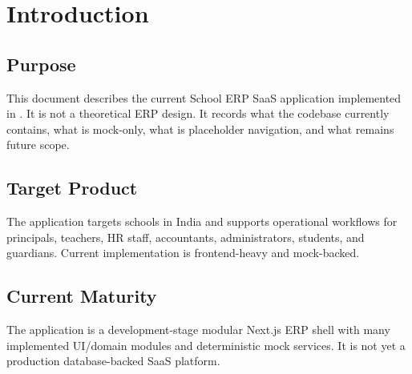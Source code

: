 \chapter{Introduction}
\section{Purpose}
This document describes the current School ERP SaaS application implemented in \RepositoryPath. It is not a theoretical ERP design. It records what the codebase currently contains, what is mock-only, what is placeholder navigation, and what remains future scope.

\section{Target Product}
The application targets schools in India and supports operational workflows for principals, teachers, HR staff, accountants, administrators, students, and guardians. Current implementation is frontend-heavy and mock-backed.

\section{Current Maturity}
\begin{statusbox}
The application is a development-stage modular Next.js ERP shell with many implemented UI/domain modules and deterministic mock services. It is not yet a production database-backed SaaS platform.
\end{statusbox}
